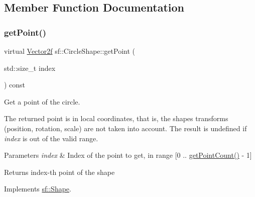 \subsection{Member Function Documentation}
\mbox{\label{classsf_1_1_circle_shape_a2d7f9715502b960b92387102fddb8736}} 
\subsubsection{\texorpdfstring{getPoint()}{getPoint()}}
{\footnotesize\ttfamily virtual \mbox{\hyperlink{classsf_1_1_vector2}{Vector2f}} sf\+::\+Circle\+Shape\+::get\+Point (\begin{DoxyParamCaption}\item[{std\+::size\+\_\+t}]{index }\end{DoxyParamCaption}) const\hspace{0.3cm}{\ttfamily [virtual]}}



Get a point of the circle. 

The returned point is in local coordinates, that is, the shape\textquotesingle{}s transforms (position, rotation, scale) are not taken into account. The result is undefined if {\itshape index} is out of the valid range.


\begin{DoxyParams}{Parameters}
{\em index} & Index of the point to get, in range \mbox{[}0 .. \mbox{\hyperlink{classsf_1_1_circle_shape_a014d29ec11e8afa4dce50e7047d99601}{get\+Point\+Count()}} -\/ 1\mbox{]}\\
\hline
\end{DoxyParams}
\begin{DoxyReturn}{Returns}
index-\/th point of the shape \begin{DoxyVerb}\end{DoxyVerb}
 
\end{DoxyReturn}


Implements \mbox{\hyperlink{classsf_1_1_shape_a40e5d83713eb9f0c999944cf96458085}{sf\+::\+Shape}}.

\mbox{\label{classsf_1_1_circle_shape_a014d29ec11e8afa4dce50e7047d99601}} 
